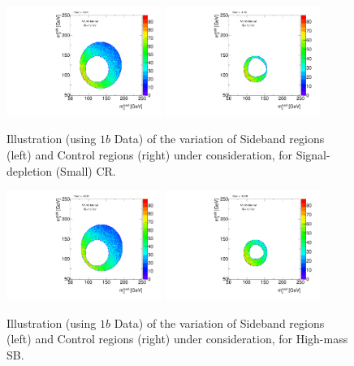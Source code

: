 \begin{figure}[htbp!]
\begin{center}
\includegraphics[width=0.45\textwidth,angle=-90]{figures/boosted/Syst_CRSB/CR_Small_Sideband_OneTag_mH0H1.pdf}
\includegraphics[width=0.45\textwidth,angle=-90]{figures/boosted/Syst_CRSB/CR_Small_Control_OneTag_mH0H1.pdf}\\
\end{center}
\caption{Illustration (using $1b$ Data) of the variation of Sideband regions (left) and Control regions (right) under consideration, for Signal-depletion (Small) CR.}
\label{CRSB:CR_Small}
\end{figure}

\begin{figure}[htbp!]
\begin{center}
\includegraphics[width=0.45\textwidth,angle=-90]{figures/boosted/Syst_CRSB/SB_High_Sideband_OneTag_mH0H1.pdf}
\includegraphics[width=0.45\textwidth,angle=-90]{figures/boosted/Syst_CRSB/SB_High_Control_OneTag_mH0H1.pdf}\\
\end{center}
\caption{Illustration (using $1b$ Data) of the variation of Sideband regions (left) and Control regions (right) under consideration, for High-mass SB.}
\label{CRSB:SB_High}
\end{figure}


